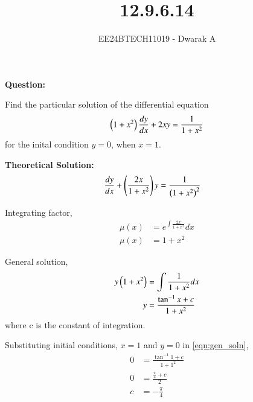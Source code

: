 \documentclass[journal]{IEEEtran}
\begin{document}

\vspace{3cm}

\title{12.9.6.14}
\author{EE24BTECH11019 - Dwarak A}
{\let\newpage\relax\maketitle}

\renewcommand{\thefigure}{\theenumi}
\renewcommand{\thetable}{\theenumi}
\setlength{\intextsep}{10pt} %


\renewcommand{\thetable}{\theenumi}

\textbf{Question:}

Find the particular solution of the differential equation
\begin{align}
    \left(1+x^2\right)\frac{dy}{dx}+2xy=\frac{1}{1+x^2}
\end{align}
for the inital condition $y = 0$, when $x = 1$.

\solution

\medskip

\textbf{Theoretical Solution:}
\begin{align}
    \frac{dy}{dx}+\left(\frac{2x}{1+x^2}\right)y &= \frac{1}{\left(1+x^2\right)^2}
\end{align}

Integrating factor,
\begin{align}
    \mu(x) &= e^{\int\frac{2x}{1+x^2}}dx \\
    \mu(x) &= 1+x^2
\end{align}

General solution,
\begin{align}
    y\left(1+x^2\right) &= \int\frac{1}{1+x^2}dx \\
    y &= \frac{\tan^{-1}x + c}{1+x^2}
    \label{eqn:gen_soln}
\end{align}
where c is the constant of integration.

Substituting initial conditions, $x=1$ and $y=0$ in \eqref{eqn:gen_soln},
\begin{align}
    0 &= \frac{\tan^{-1}1 + c}{1+1^2} \\
    0 &= \frac{\frac{\pi}{4} + c}{2} \\
    c &= -\frac{\pi}{4}
    \label{eqn:int_const}
\end{align}
\end{document}
